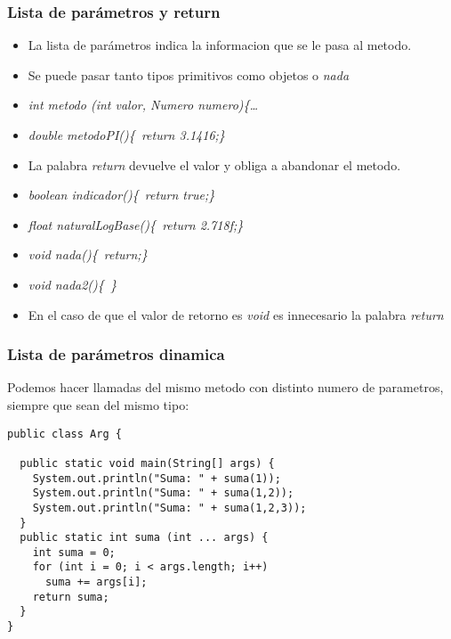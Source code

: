 \documentclass{beamer}
\begin{document}
\begin{frame}
\frametitle{Lista de parámetros y return}
\begin{itemize}[<+-|alert@+>]
\item La lista de parámetros indica la informacion que se le pasa al metodo.
\item Se puede pasar tanto tipos primitivos como objetos o \emph{nada}
\item \emph{int metodo (int valor, Numero numero)\{\dots}
\item \emph{double metodoPI()\{\ return 3.1416;\}}
\item La palabra \emph{return} devuelve el valor y obliga a abandonar el metodo.
\item \emph{boolean indicador()\{\ return true;\}}
\item \emph{float naturalLogBase()\{\ return 2.718f;\}}
\item \emph{void nada()\{\ return;\}}
\item \emph{void nada2()\{\ \}}
\item En el caso de que el valor de retorno es \emph{void} es innecesario la palabra \emph{return}
\end{itemize}
\pause
\end{frame}

\begin{frame}[fragile]
\frametitle{Lista de parámetros dinamica}
Podemos hacer llamadas del mismo metodo con distinto numero de parametros, siempre que sean del mismo tipo:
\pause
\begin{verbatim}
public class Arg {

  public static void main(String[] args) {
    System.out.println("Suma: " + suma(1));
    System.out.println("Suma: " + suma(1,2));
    System.out.println("Suma: " + suma(1,2,3));
  }
  public static int suma (int ... args) {
    int suma = 0;
    for (int i = 0; i < args.length; i++)
      suma += args[i];
    return suma;
  }
}
\end{verbatim}
\end{frame}
\end{document}
